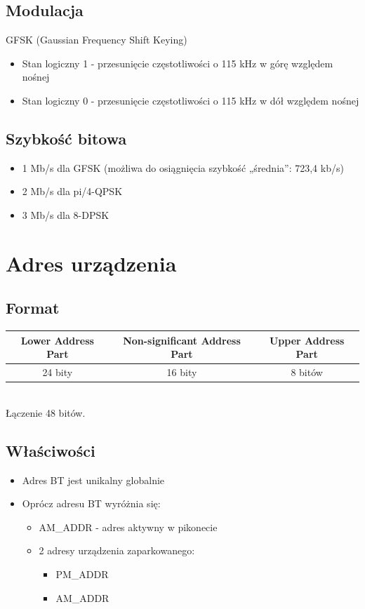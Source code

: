 \subsection{Modulacja}
GFSK (Gaussian Frequency Shift Keying)\\
\begin{itemize}
	\item Stan logiczny 1 - przesunięcie częstotliwości o 115 kHz w górę względem nośnej
	\item Stan logiczny 0 - przesunięcie częstotliwości o 115 kHz w dół względem nośnej
\end{itemize}
\subsection{Szybkość bitowa}
\begin{itemize}
	\item 1 Mb/s dla GFSK (możliwa do osiągnięcia szybkość „średnia”: 723,4 kb/s)
	\item 2 Mb/s dla pi/4-QPSK
	\item 3 Mb/s dla 8-DPSK
\end{itemize}


\section{Adres urządzenia}
\subsection{Format}
\begin{tabular}{|c|c|c|}
	\hline Lower Address Part & Non-significant Address Part & Upper Address Part \\ 
	\hline 24 bity & 16 bity & 8 bitów \\ 
	\hline 
\end{tabular}\\
Łączenie 48 bitów.
\subsection{Właściwości}
\begin{itemize}
	\item Adres BT jest unikalny globalnie
	\item Oprócz adresu BT wyróżnia się:
	\begin{itemize}
		\item AM\_ADDR - adres aktywny w pikonecie
		\item 2 adresy urządzenia zaparkowanego:
		\begin{itemize}
			\item PM\_ADDR
			\item AM\_ADDR
		\end{itemize}
	\end{itemize}
\end{itemize}

